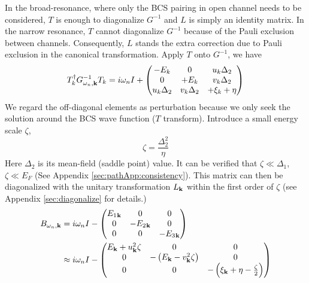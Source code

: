 In the broad-resonance, where only the BCS pairing in open channel needs to be considered, $T$ is enough to diagonalize $G^{-1}$ and $L$ is simply an identity matrix.  %
In the narrow resonance, $T$ cannot diagonalize $G^{-1}$ because of the Pauli exclusion between channels.  Consequently, $L$ stands the extra correction due to Pauli exclusion in the canonical transformation. Apply $T$ onto $G^{-1}$, we have 
\begin{equation}\label{eq:pathInt2:G2}
T_k^{\dagger}G_{\omega_{n},\mathbf{k}}^{-1}T_k=i\omega_nI+\begin{pmatrix}-E_k&0&u_k\Delta_2\\0&+E_k&v_k\Delta_2\\u_k\Delta_2&v_k\Delta_2&+\xi_k+\eta\end{pmatrix}
\end{equation}
We regard the off-diagonal elements as perturbation because  we  only seek the solution around the BCS wave function ($T$ transform). 
Introduce a small energy scale $\zeta$,
\begin{equation}
\zeta=\frac{\Delta_{2}^{2}}{\eta}
\end{equation}
Here $\Delta_{2}$ is its mean-field (saddle point) value.  It can be verified that $\zeta\ll\Delta_{1}$, $\zeta\ll{}E_{F}$ (See Appendix \ref{sec:pathApp:consistency}).  
This matrix can then be diagonalized with  the unitary transformation $L_{\mathbf{k}}$ within the first order of $\zeta$  (see Appendix \ref{sec:diagonalize} for details.)
\begin{equation}\label{eq:pathInt2:Bapprox}
\begin{split}
B_{\omega_{n},\mathbf{k}}&=i\omega_{n}I-
	\begin{pmatrix}E_{1}{}_{\mathbf{k}}&0&0\\0&-E_{2}{}_{\mathbf{k}}&0\\0&0&-E_{3}{}_{\mathbf{k}}\end{pmatrix}\\
	&\approx{}i\omega_{n}I-
	\begin{pmatrix}E_{\mathbf{k}}+{}u_{\mathbf{k}}^{2}\zeta&0&0\\
	0&-\left(E_{\mathbf{k}}-{}v_{\mathbf{k}}^{2}\zeta\right)&0\\0&0&-\left(\xi_{\mathbf{k}}+\eta-\frac{\zeta}{2}\right)\end{pmatrix}
\end{split}	
\end{equation}
